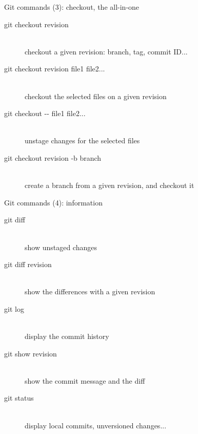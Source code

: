 \begin{frame}{Git commands (3): checkout, the all-in-one}
  \begin{description}
    \item[git checkout revision] \hfill \\
      checkout a given revision: branch, tag, commit ID...
    \item[git checkout revision file1 file2...] \hfill \\
      checkout the selected files on a given revision
    \item[git checkout -{}- file1 file2...] \hfill \\
      unstage changes for the selected files
    \item[git checkout revision -b branch] \hfill \\
      create a branch from a given revision, and checkout it
  \end{description}
\end{frame}

\begin{frame}{Git commands (4): information}
  \begin{description}
    \item[git diff] \hfill \\
      show unstaged changes
    \item[git diff revision] \hfill \\
      show the differences with a given revision
    \item[git log] \hfill \\
      display the commit history
    \item[git show revision] \hfill \\
      show the commit message and the diff
    \item[git status] \hfill \\
      display local commits, unversioned changes...
  \end{description}
\end{frame}
